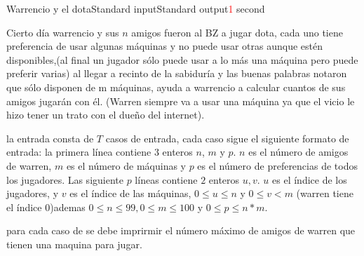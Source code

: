 \begin{problem}{Warrencio y el dota}{Standard input}{Standard output}{\textcolor{red}{1} second}{}


Cierto día warrencio y sus $n$ amigos fueron al BZ a jugar dota, cada uno tiene preferencia de usar algunas máquinas y no puede usar otras aunque estén disponibles,(al final un jugador sólo puede usar a lo más una máquina pero puede preferir varias) al llegar a recinto de la sabiduría y las buenas palabras notaron que sólo disponen de m máquinas, ayuda a warrencio a calcular cuantos de sus amigos jugarán con él. (Warren siempre va a usar una máquina ya que el vicio le hizo tener un trato con el dueño del internet).

\InputFile
la entrada consta de $T$ casos de entrada, cada caso sigue el siguiente formato de entrada: 
la primera línea contiene $3$ enteros $n$, $m $ y $ p$. $n$ es el número de amigos de warren, $m$ es el número de máquinas y $p$ es el número de preferencias de todos los jugadores. Las siguiente $p$ líneas contiene $2$ enteros $u,v$. $u$ es el índice de los jugadores, y $v$ es el índice de las máquinas, $0 \leq u \leq n$  y $0 \leq v<m$ (warren tiene el índice $0$)ademas $0 \leq n \leq 99,0 \leq m \leq 100$ y $0 \leq p \leq n*m$.


\OutputFile
para cada caso de se debe imprirmir el número máximo de amigos de warren que tienen una maquina para jugar.  


\Example


\begin{example}
\end{example}

\end{problem}
